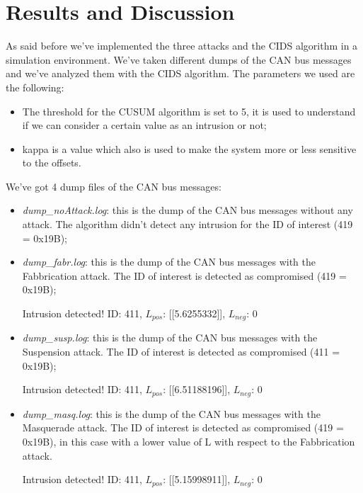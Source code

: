 \documentclass[12pt]{article}
\begin{document}
\section{Results and Discussion}
As said before we've implemented the three attacks and the CIDS algorithm in a simulation environment.
We've taken different dumps of the CAN bus messages and we've analyzed them with the CIDS algorithm. 
The parameters we used are the following:
\begin{itemize}
    \item The threshold for the CUSUM algorithm is set to 5, it is used to understand if we can consider a certain 
    value as an intrusion or not;
    \item kappa is a value which also is used to make the system more or less sensitive to the offsets.
\end{itemize}
We've got 4 dump files of the CAN bus messages:
\begin{itemize}
    \item \textit{dump\_noAttack.log}: this is the dump of the CAN bus messages without any attack. The algorithm 
    didn't detect any intrusion for the ID of interest (419 = 0x19B);
    \item \textit{dump\_fabr.log}: this is the dump of the CAN bus messages with the Fabbrication attack. The ID 
    of interest is detected as compromised (419 = 0x19B);
    \begin{center}
        Intrusion detected! ID: 411, $L_{pos}$: [[5.6255332]], $L_{neg}$: 0
    \end{center}
    \item \textit{dump\_susp.log}: this is the dump of the CAN bus messages with the Suspension 
    attack. The ID of interest is detected as compromised (411 = 0x19B);
    \begin{center}
        Intrusion detected! ID: 411, $L_{pos}$: [[6.51188196]], $L_{neg}$: 0
    \end{center}
    \item \textit{dump\_masq.log}: this is the dump of the CAN bus messages with the Masquerade attack. 
    The ID of interest is detected as compromised (419 = 0x19B), in this case with a lower value 
    of L with respect to the Fabbrication attack. 
    \begin{center}
        Intrusion detected! ID: 411, $L_{pos}$: [[5.15998911]], $L_{neg}$: 0
    \end{center}
\end{itemize}

\printbibliography 
\end{document}
